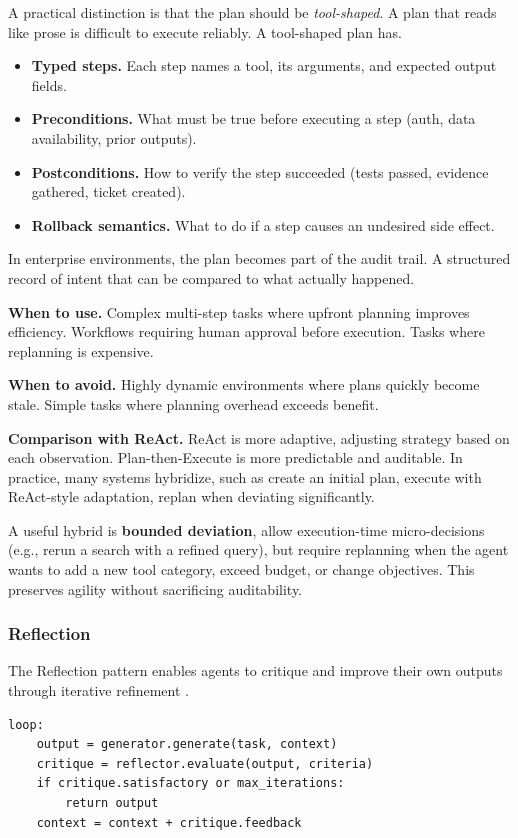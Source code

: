 A practical distinction is that the plan should be \textit{tool-shaped}. A plan that reads like prose is difficult to execute reliably. A tool-shaped plan has.
\begin{itemize}
\item \textbf{Typed steps.} Each step names a tool, its arguments, and expected output fields.
\item \textbf{Preconditions.} What must be true before executing a step (auth, data availability, prior outputs).
\item \textbf{Postconditions.} How to verify the step succeeded (tests passed, evidence gathered, ticket created).
\item \textbf{Rollback semantics.} What to do if a step causes an undesired side effect.
\end{itemize}
In enterprise environments, the plan becomes part of the audit trail. A structured record of intent that can be compared to what actually happened.

\textbf{When to use.} Complex multi-step tasks where upfront planning improves efficiency. Workflows requiring human approval before execution. Tasks where replanning is expensive.

\textbf{When to avoid.} Highly dynamic environments where plans quickly become stale. Simple tasks where planning overhead exceeds benefit.

\textbf{Comparison with ReAct.} ReAct is more adaptive, adjusting strategy based on each observation. Plan-then-Execute is more predictable and auditable. In practice, many systems hybridize, such as create an initial plan, execute with ReAct-style adaptation, replan when deviating significantly.

A useful hybrid is \textbf{bounded deviation}, allow execution-time micro-decisions (e.g., rerun a search with a refined query), but require replanning when the agent wants to add a new tool category, exceed budget, or change objectives. This preserves agility without sacrificing auditability.

\subsubsection{Reflection}

The Reflection pattern enables agents to critique and improve their own outputs through iterative refinement \cite{reflexion2023}.

\begin{verbatim}
loop:
    output = generator.generate(task, context)
    critique = reflector.evaluate(output, criteria)
    if critique.satisfactory or max_iterations:
        return output
    context = context + critique.feedback
\end{verbatim}

